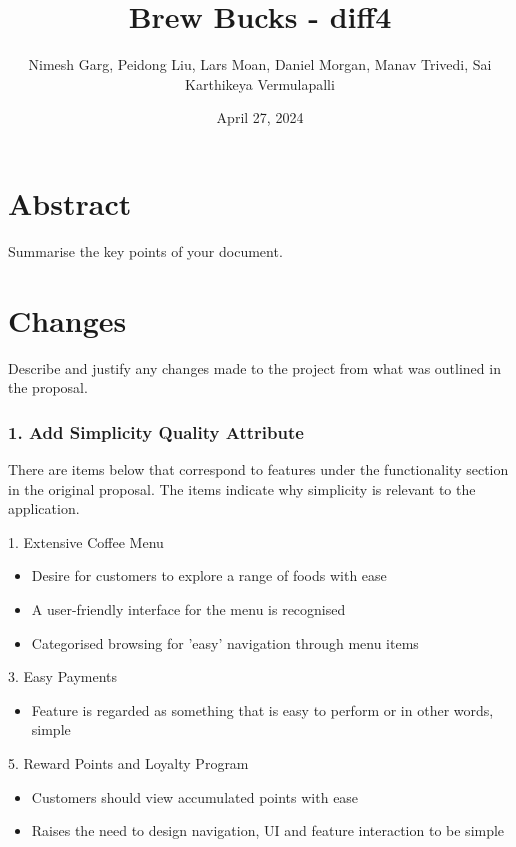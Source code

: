 \documentclass{article}
\title{Brew Bucks - diff4}
\author{Nimesh Garg, Peidong Liu, Lars Moan, Daniel Morgan, Manav Trivedi, Sai Karthikeya Vermulapalli}
\date{April 27, 2024}
\begin{document}
\maketitle
\pagebreak

\tableofcontents
\pagebreak

\section{Abstract}
Summarise the key points of your document.
\section{Changes}
Describe and justify any changes made to the project from what was outlined in the proposal.

\subsubsection*{1. Add Simplicity Quality Attribute}
There are items below that correspond to features under the functionality section in the original proposal. The items indicate why simplicity is relevant to the application.

\medskip \begin{minipage}{\dimexpr\textwidth-0.25cm}
1. Extensive Coffee Menu 
\begin{itemize}
    \item Desire for customers to explore a range of foods with ease
    \item A user-friendly interface for the menu is recognised
    \item Categorised browsing for 'easy' navigation through menu items
\end{itemize}

3. Easy Payments
\begin{itemize}
    \item Feature is regarded as something that is easy to perform or in other words, simple
\end{itemize}

5. Reward Points and Loyalty Program
\begin{itemize}
    \item Customers should view accumulated points with ease
    \item Raises the need to design navigation, UI and feature interaction to be simple
\end{itemize}
\end{minipage}
\end{document}
